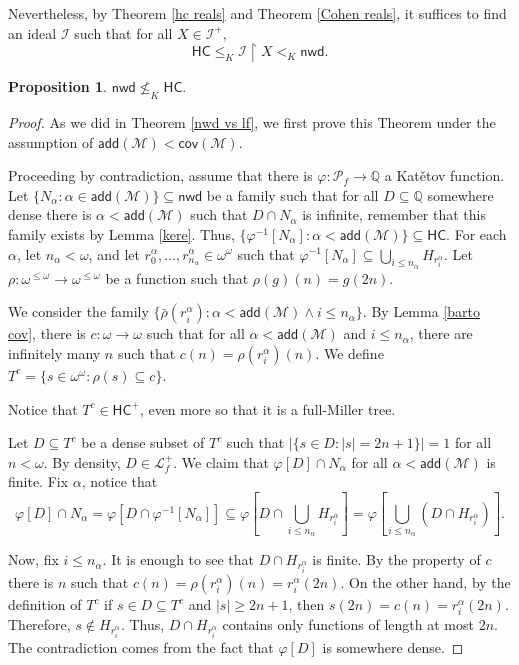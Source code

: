 \documentclass{amsart}
\theoremstyle{definition}
\newtheorem{proposition}[theorem]{Proposition}
\theoremstyle{remark}
\numberwithin{equation}{section}
\newcommand{\nwd}{\mathsf{nwd}}
\newcommand{\hc}{\mathsf{HC}}
\newcommand{\add}{\mathsf{add}}
\newcommand{\cov}{\mathsf{cov}}
\newcommand{\lf}{\mathcal{L}_f}
\newcommand{\id}{\mathcal{I}}
\newcommand{\restr}[2]{#1\upharpoonright {#2}}
\begin{document}
Nevertheless, by Theorem \ref{hc reals} and Theorem \ref{Cohen reals}, it suffices to find an ideal $\id$ such that for all $X\in\id^+$,
\[
\hc\leq_K \restr{\id}{X} <_K \nwd.
\]



\begin{proposition}
    $\nwd\not\leq_K \hc$. 
\end{proposition}
\begin{proof}
    As we did in Theorem \ref{nwd vs lf}, we first prove this Theorem under the assumption of $\add(\mathcal{M})<\cov(\mathcal{M})$.

    Proceeding by contradiction, assume that there is $\varphi:\mathcal{P}_f\rightarrow \mathbb{Q}$ a Kat\v{e}tov function. Let $\{N_\alpha:\alpha\in \add(\mathcal{M})\}\subseteq\nwd$ be a  family such that for all $D\subseteq \mathbb{Q}$ somewhere dense there is $\alpha<\add(\mathcal{M})$ such that $D\cap N_\alpha$ is infinite, remember that this family exists by Lemma \ref{kere}. Thus, $\{\varphi^{-1}[N_\alpha]:\alpha<\add(\mathcal{M})\} \subseteq \hc $. For each $\alpha$, let $n_\alpha<\omega$, and let $r_0^\alpha, \dots, r_{n_\alpha}^\alpha\in\omega^\omega$  such that $\varphi^{-1}[N_\alpha] \subseteq \bigcup_{i\leq n_\alpha} H_{r_i^\alpha}$. Let $\rho:\omega^{\leq \omega}\rightarrow\omega^{\leq \omega}$ be a function such that $\rho(g)(n)=g(2n)$.

    We consider the family $\{\bar\rho(r_i^\alpha): \alpha<\add(\mathcal{M}) \wedge i\leq n_\alpha\}$. By Lemma \ref{barto cov}, there is $c:\omega\rightarrow \omega$ such that for all $\alpha<\add(\mathcal{M})$ and $i\leq n_\alpha$, there are infinitely many $n$ such that  $c(n)= \rho(r_i^\alpha)(n)$. We define $T^{c}=\{s\in \omega^\omega: \rho(s)\subseteq c \}$.

    Notice that $T^c\in \hc^+$, even more so that it is a full-Miller tree.
    
    Let $D\subseteq T^c$ be a dense subset of  $T^c$ such that $|\{s\in D: |s|=2n+1\}|=1$ for all $n<\omega$. By density, $D\in\lf^+$. We claim that $\varphi [D]\cap N_\alpha$ for all $\alpha<\add(\mathcal{M})$ is finite. Fix $\alpha$, notice that
    \[
    \varphi[D]\cap N_\alpha =\varphi[D\cap \varphi^{-1}[N_\alpha]]\subseteq \varphi[D\cap \bigcup_{i\leq n_\alpha}H_{r_i^\alpha}] = \varphi[\bigcup_{i\leq n_\alpha}(D\cap H_{r_i^\alpha})].
    \]

    Now, fix $i\leq n_\alpha$. It is enough to see that $D\cap H_{r_i^\alpha}$ is finite. By the property of $c$ there is $n$ such that $c(n)= \rho (r_i^\alpha)(n)=r_i^\alpha(2n)$. On the other hand, by the definition of $T^c$ if $s\in D\subseteq T^c$ and $|s|\geq2n+1$, then $s(2n)= c(n)=r_i^\alpha(2n)$. Therefore, $s\notin H_{r_i^\alpha}$. Thus, $D\cap H_{r_i^\alpha}$ contains only functions of length at most $2n$. The contradiction comes from the fact that $\varphi[D]$ is somewhere dense.



\end{proof}
\end{document}
